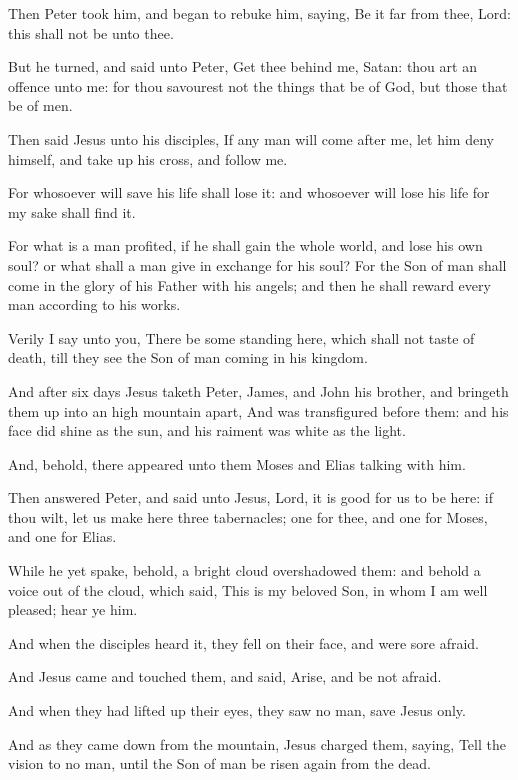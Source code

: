 \Verse Then Peter took him, and began to rebuke him, saying, Be it far from thee, Lord: this shall not be unto thee.

\Verse But he turned, and said unto Peter, Get thee behind me, Satan: thou art an offence unto me: for thou savourest not the things that be of God, but those that be of men.

\Verse Then said Jesus unto his disciples, If any man will come after me, let him deny himself, and take up his cross, and follow me.

\Verse For whosoever will save his life shall lose it: and whosoever will lose his life for my sake shall find it.

\Verse For what is a man profited, if he shall gain the whole world, and lose his own soul? or what shall a man give in exchange for his soul?  \Verse For the Son of man shall come in the glory of his Father with his angels; and then he shall reward every man according to his works.

\Verse Verily I say unto you, There be some standing here, which shall not taste of death, till they see the Son of man coming in his kingdom.


\Chapter
\Verse And after six days Jesus taketh Peter, James, and John his brother, and bringeth them up into an high mountain apart, \Verse And was transfigured before them: and his face did shine as the sun, and his raiment was white as the light.

\Verse And, behold, there appeared unto them Moses and Elias talking with him.

\Verse Then answered Peter, and said unto Jesus, Lord, it is good for us to be here: if thou wilt, let us make here three tabernacles; one for thee, and one for Moses, and one for Elias.

\Verse While he yet spake, behold, a bright cloud overshadowed them: and behold a voice out of the cloud, which said, This is my beloved Son, in whom I am well pleased; hear ye him.

\Verse And when the disciples heard it, they fell on their face, and were sore afraid.

\Verse And Jesus came and touched them, and said, Arise, and be not afraid.

\Verse And when they had lifted up their eyes, they saw no man, save Jesus only.

\Verse And as they came down from the mountain, Jesus charged them, saying, Tell the vision to no man, until the Son of man be risen again from the dead.

